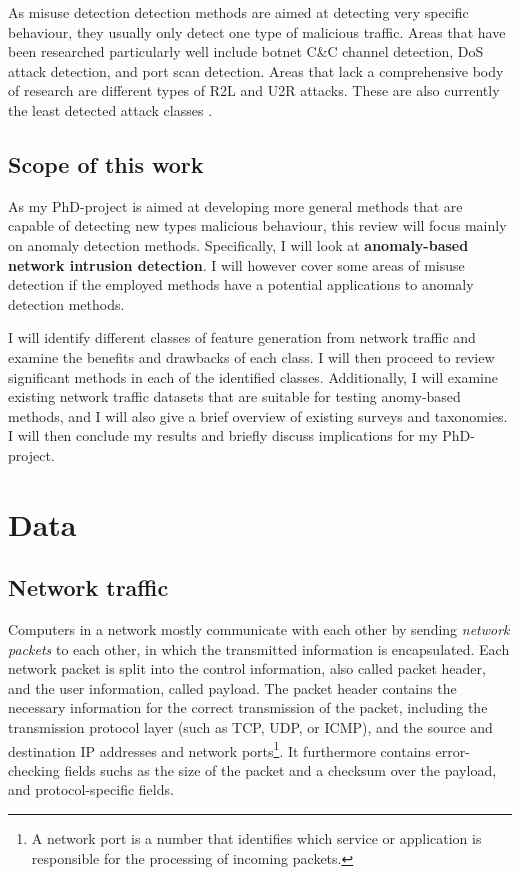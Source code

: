 \documentclass[a4paper,12pt,twoside]{report}
\begin{document}
As misuse detection detection methods are aimed at detecting very specific behaviour, they usually only detect one type of malicious traffic. Areas that have been researched particularly well include botnet C\&C channel detection, DoS attack detection, and port scan detection. Areas that lack a comprehensive body of research are different types of R2L and U2R attacks. These are also currently the least   detected   attack   classes \cite{nisioti2018intrusion}.

\section{Scope of this work}

As my PhD-project is aimed at developing more general methods that are capable of detecting new types malicious behaviour, this review will focus mainly on anomaly detection methods. Specifically, I will look at \textbf{anomaly-based network intrusion detection}. I will however cover some areas of misuse detection if the employed methods have a potential applications to anomaly detection methods.


I will identify different classes of feature generation from network traffic and examine the benefits and drawbacks of each class. I will then proceed to review significant methods in each of the identified classes. Additionally, I will examine existing network traffic datasets that are suitable for testing anomy-based methods, and I will also give a brief overview of existing surveys and taxonomies. I will then conclude my results and briefly discuss implications for my PhD-project.

\chapter{Data}

\section{Network traffic}\label{traffic}



Computers in a network mostly communicate with each other by sending \textit{network packets} to each other, in which the transmitted information is encapsulated. Each network packet is split into the control information, also called packet header, and the user information, called payload. The packet header contains the necessary information for the correct transmission of the packet, including the transmission protocol layer (such as TCP, UDP, or ICMP), and the source and destination IP addresses and network ports\footnote{A network port is a number that identifies which service or application is responsible for the processing of incoming packets.}. It furthermore contains error-checking fields suchs as the size of the packet and a checksum over the payload, and protocol-specific fields. 
\end{document}
